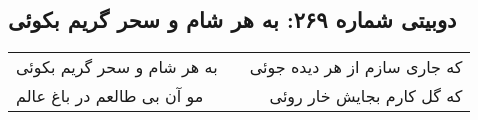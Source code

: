 \begin{center}
\section*{دوبیتی شماره ۲۶۹: به هر شام و سحر گریم بکوئی}
\label{sec:269}
\begin{longtable}{l p{0.5cm} r}
به هر شام و سحر گریم بکوئی
&&
که جاری سازم از هر دیده جوئی
\\
مو آن بی طالعم در باغ عالم
&&
که گل کارم بجایش خار روئی
\\
\end{longtable}
\end{center}
